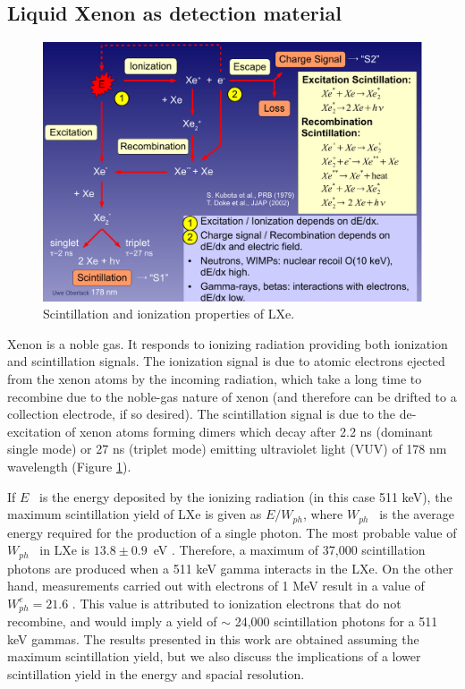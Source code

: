 \subsection{Liquid Xenon as detection material}


\begin{figure}[!bhtp]
	\centering
	\includegraphics[scale=0.5]{img/XeLight.pdf}
	\caption{\label{fig.xel} Scintillation and ionization properties of LXe.}
\end{figure}

Xenon is a noble gas. It responds to ionizing radiation providing both ionization and scintillation signals. The ionization signal is due to atomic electrons ejected from the xenon atoms by the incoming radiation, which take a long time to recombine due to the noble-gas nature of xenon (and therefore can be drifted to a collection electrode, if so desired). The scintillation signal is due to the de-excitation of xenon atoms forming dimers which decay after 2.2 ns (dominant single mode) or 27 ns (triplet mode) emitting ultraviolet light (VUV) of 178 nm wavelength (Figure \ref{fig.xel}).

If $E$~ is the energy deposited by the ionizing radiation (in this case 511 keV), the maximum scintillation yield of LXe is given as $E/W_{ph}$, where $W_{ph}$~ is the average energy required for the production of a single photon. The most probable value of $W_{ph}$~ in LXe  is  $13.8 \pm 0.9$~eV \cite{aprile10}. Therefore, a maximum of 37,000 scintillation photons are produced when a 511 keV gamma interacts in the LXe. On the other hand, measurements carried out with electrons of 1 MeV result in a value of $W_{ph}^e = 21.6$ \cite{doke02}. This value is attributed to ionization electrons that do not recombine, and would imply a yield of $\sim$ 24,000 scintillation photons for a 511 keV gammas. The results presented in this work are obtained assuming the maximum scintillation yield, but we also discuss the implications of a lower scintillation yield in the energy and spacial resolution. 

